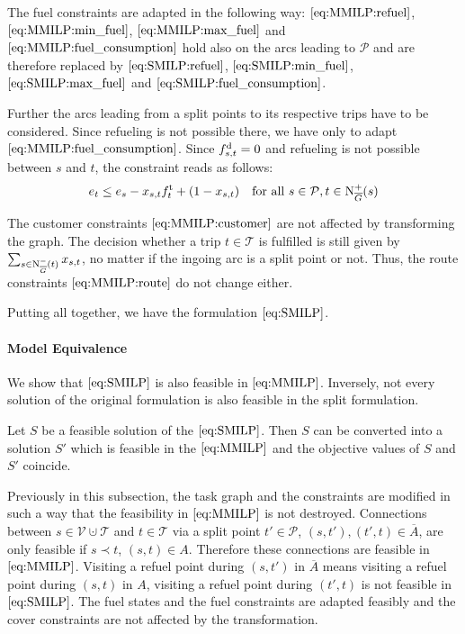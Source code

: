 The fuel constraints are adapted in the following way: $\eqref{eq:MMILP:refuel}$, $\eqref{eq:MMILP:min_fuel}$, $\eqref{eq:MMILP:max_fuel}$ and $\eqref{eq:MMILP:fuel_consumption}$ hold also on the arcs leading to $\mathcal{P}$ and are therefore replaced by $\eqref{eq:SMILP:refuel}$, $\eqref{eq:SMILP:min_fuel}$, $\eqref{eq:SMILP:max_fuel}$ and $\eqref{eq:SMILP:fuel_consumption}$.

Further the arcs leading from a split points to its respective trips have to be considered. Since refueling is not possible there, we have only to adapt $\eqref{eq:MMILP:fuel_consumption}$. Since $f^{\operatorname{d}}_{s,t} = 0$ and refueling is not possible between $s$ and $t$, the constraint reads as follows:
\begin{align}
	e_t \leq e_s - x_{s,t}f^{\operatorname{t}}_t + \left(1-x_{s,t}\right) && \text{for all } s\in \mathcal{P},t\in\operatorname{N}_{\overline{G}}^+(s) \label{eq:SMILP:fuel_splitpoint}
\end{align}

The customer constraints $\eqref{eq:MMILP:customer}$ are not affected by transforming the graph. The decision whether a trip $t\in\mathcal{T}$ is fulfilled is still given by $\sum_{s\in\operatorname{N}_{\overline{G}}^-(t)} x_{s,t}$, no matter if the ingoing arc is a split point or not. Thus, the route constraints $\eqref{eq:MMILP:route}$ do not change either.

Putting all together, we have the formulation $\eqref{eq:SMILP}$.

\paragraph{Model Equivalence} \parfill

We show that $\eqref{eq:SMILP}$ is also feasible in $\eqref{eq:MMILP}$. Inversely, not every solution of the original formulation is also feasible in the split formulation.

\begin{theorem}

Let $S$ be a feasible solution of the $\eqref{eq:SMILP}$. Then $S$ can be converted into a solution $S'$ which is feasible in the $\eqref{eq:MMILP}$ and the objective values of $S$ and $S'$ coincide.

\end{theorem}

Previously in this subsection, the task graph and the constraints are modified in such a way that the feasibility in $\eqref{eq:MMILP}$ is not destroyed. Connections between ${s\in\mathcal{V}\cupdot\mathcal{T}}$ and ${t\in\mathcal{T}}$ via a split point ${t'\in\mathcal{P}}$, \ie ${(s,t'),(t',t)\in\overline{A}}$, are only feasible if ${s\prec t}$, \ie ${(s,t)\in A}$. Therefore these connections are feasible in $\eqref{eq:MMILP}$. Visiting a refuel point during $\left(s,t'\right)$ in $\overline{A}$ means visiting a refuel point during $(s,t)$ in $A$, visiting a refuel point during $\left(t',t\right)$ is not feasible in $\eqref{eq:SMILP}$. The fuel states and the fuel constraints are adapted feasibly and the cover constraints are not affected by the transformation.

